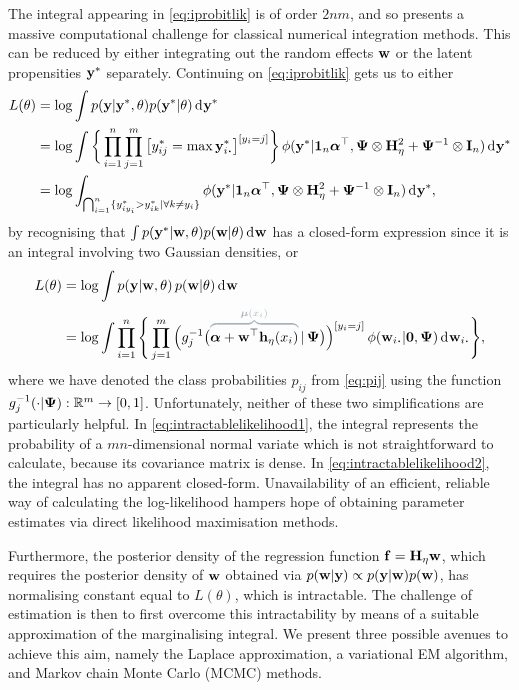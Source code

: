 The integral appearing in \cref{eq:iprobitlik} is of order $2nm$, and so presents a massive computational challenge for classical numerical integration methods.
This can be reduced by either integrating out the random effects ${\mathbf w}$ or the latent propensities ${\mathbf y}^*$ separately.
Continuing on \cref{eq:iprobitlik} gets us to either
\begin{align}
  L(\theta) 
  &= \log \int p(\by|\by^*,\theta) p(\by^*|\theta) \dint \by^* \nonumber \\
  &= \log \int \bigg\{ \prod_{i=1}^n \prod_{j=1}^m \big[y_{ij}^* 
  = \max \by^*_{i\bigcdot}\big]^{[y_i = j]} \bigg\} \,
  \phi(\by^*|\bone_n\balpha^\top, \bPsi \otimes \bH_\eta^2 + \bPsi^{-1} \otimes \bI_n) \dint \by^* \nonumber \\
  &= \log 
  \int_{\bigcap_{i=1}^n  \{ y_{iy_i}^* > y_{ik}^* | \forall k \neq y_i \}}
  \phi(\by^*|\bone_n\balpha^\top, \bPsi \otimes \bH_\eta^2 + \bPsi^{-1} \otimes \bI_n) \dint \by^*, 
  \label{eq:intractablelikelihood1}
\end{align}
by recognising that $\int p({\mathbf y}^*|{\mathbf w},\theta) p({\mathbf w}|\theta) \operatorname{d}\hspace{0.5pt}\! {\mathbf w}$ has a closed-form expression since it is an integral involving two Gaussian densities, or 
\begin{align}
  L(\theta) 
  &= \log \int p(\by | \bw, \theta) \, p(\bw|\theta) \dint \bw \nonumber \\
  &= \log \int \prod_{i=1}^n \Bigg\{ \prod_{j=1}^m \Big( g_j^{-1} \big(  
  \greyoverbrace{\balpha + \bw^\top \bh_\eta(x_i)}{\hidewidth \bmu(x_i) \hidewidth}
  \,|\, \bPsi \big) \Big)^{[y_i=j]} \, \phi(\bw_{i \bigcdot}|\bzero,\bPsi) \dint \bw_{i \bigcdot} \Bigg\}, 
  \label{eq:intractablelikelihood2}
\end{align}
where we have denoted the class probabilities $p_{ij}$ from \cref{eq:pij} using the function $g_j^{-1}(\cdot|{\bm\Psi}):\mathbb{R}^m \to [0,1]$.
Unfortunately, neither of these two simplifications are particularly helpful.
In \cref{eq:intractablelikelihood1}, the integral represents the probability  of a $mn$-dimensional normal variate which is not straightforward to calculate, because its covariance matrix is dense.
In \cref{eq:intractablelikelihood2}, the integral has no apparent closed-form.
Unavailability of an efficient, reliable way of calculating the log-likelihood hampers hope of obtaining parameter estimates via direct likelihood maximisation methods.

Furthermore, the posterior density of the regression function ${\mathbf f} = {\mathbf H}_\eta {\mathbf w}$, which requires the posterior density of ${\mathbf w}$ obtained via $p({\mathbf w}|{\mathbf y}) \propto p({\mathbf y}|{\mathbf w})p({\mathbf w})$, has normalising constant equal to  $L(\theta)$, which is intractable.
The challenge of estimation is then to first overcome this intractability by means of a suitable approximation of the marginalising integral.
We present three possible avenues to achieve this aim, namely the Laplace approximation, a variational EM algorithm, and Markov chain Monte Carlo (MCMC) methods.

